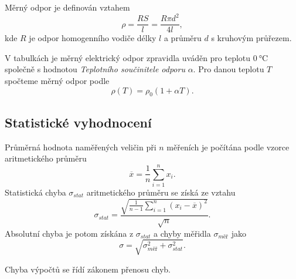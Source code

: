 \documentclass[0-protokol.tex]{subfiles}
\begin{document}
Měrný odpor je definován vztahem 
\begin{equation} \label{eq:merny_odpor}
\rho = \frac{RS}{l} = \frac{R \pi d^2}{4l},
\end{equation}
kde $R$ je odpor homogenního vodiče délky $l$ a průměru $d$ s kruhovým průřezem.

V tabulkách je měrný elektrický odpor zpravidla uváděn pro teplotu $\SI{0}{\celsius}$ společně s hodnotou \textit{Teplotního součinitele odporu} $\alpha$. Pro danou teplotu $T$ spočteme měrný odpor podle
\begin{equation} \label{eq:odpor_teplota}
\rho(T) = \rho_0 (1 + \alpha T).
\end{equation}

\subsection*{Statistické vyhodnocení}
Průměrná hodnota naměřených veličin při $n$ měřeních je počítána podle vzorce aritmetického průměru 
\begin{equation}
\overline{x} = \frac{1}{n} \sum\limits_{i=1}^n{x_i}.
\end{equation}
Statistická chyba $\sigma_{stat}$ aritmetického průměru se získá ze vztahu 
\begin{equation}
\sigma_{stat} = \frac{\sqrt{\frac{1}{n-1} \sum\limits_{i=1}^n{(x_i - \overline{x})^2}}}{\sqrt{n}}.
\end{equation}
Absolutní chyba je potom získána z $\sigma_{stat}$ a chyby měřidla $\sigma_{\textit{měř}}$ jako 
\begin{equation}
\sigma = \sqrt{\sigma_{\textit{měř}}^2 + \sigma_{stat}^2}.
\end{equation}

Chyba výpočtů se řídí zákonem přenosu chyb.
\end{document}

